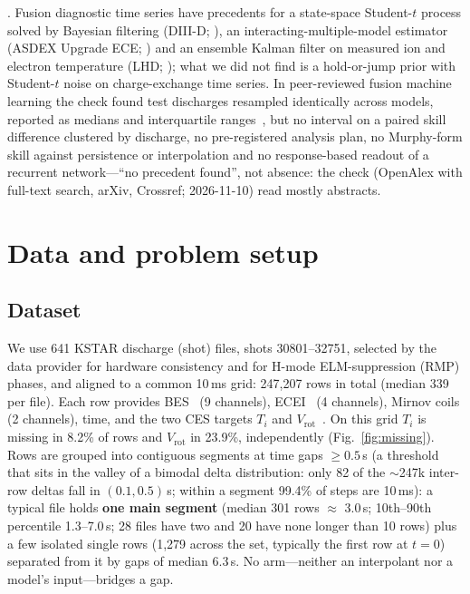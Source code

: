 \documentclass[10pt]{article}
\newcommand{\Ti}{\ensuremath{T_i}}
\newcommand{\Vrot}{\ensuremath{V_\mathrm{rot}}}
\begin{document}
\citet{Agamennoni2012ApproximateInference}. Fusion diagnostic time series have
precedents for a state-space Student-$t$ process solved by Bayesian filtering
(DIII-D; \citealp{Rath2022DataAugmentation}), an interacting-multiple-model estimator
(ASDEX Upgrade ECE; \citealp{vandenBrand2016ModelBased}) and an ensemble Kalman filter
on measured ion and electron temperature (LHD;
\citealp{Morishita2020DataAssimilation}); what we did not find is a hold-or-jump prior
with Student-$t$ noise on charge-exchange time series. In peer-reviewed fusion machine
learning the check found test discharges resampled identically across models,
reported as medians and interquartile ranges~\citep{Keith2024RiskAware}, but no
interval on a paired skill difference clustered by discharge, no pre-registered
analysis plan, no Murphy-form skill against persistence or interpolation and no
response-based readout of a recurrent network---``no precedent found'', not absence:
the check (OpenAlex with full-text search, arXiv, Crossref; 2026-11-10) read mostly
abstracts.

\section{Data and problem setup}
\label{sec:data}

\subsection{Dataset}
We use 641 KSTAR discharge (shot) files, shots 30801--32751, selected by the data
provider for hardware consistency and for H-mode ELM-suppression (RMP) phases, and
aligned to a common 10\,ms grid: 247{,}207 rows in total (median 339 per file).
Each row provides BES~\citep{Nam2012AnalysisEdge} (9 channels),
ECEI~\citep{Yun2010DevelopmentKstar} (4 channels), Mirnov coils (2 channels), time,
and the two CES targets \Ti{} and \Vrot{}~\citep{Ko2010ChargeExchange}. On this grid
\Ti{} is missing in 8.2\% of rows and \Vrot{} in 23.9\%, independently
(Fig.~\ref{fig:missing}). Rows are grouped into contiguous segments at time gaps
$\geq 0.5$\,s (a threshold that sits in the valley of a bimodal delta distribution:
only 82 of the $\sim$247k inter-row deltas fall in $(0.1, 0.5)$\,s; within a
segment 99.4\% of steps are 10\,ms): a typical file holds \textbf{one main segment}
(median 301 rows $\approx$ 3.0\,s; 10th--90th percentile 1.3--7.0\,s; 28 files
have two and 20 have none longer than 10 rows) plus a few isolated single rows
(1{,}279 across the set, typically the first row at $t = 0$) separated from it by
gaps of median 6.3\,s. No arm---neither an interpolant nor a model's
input---bridges a gap.
\end{document}
